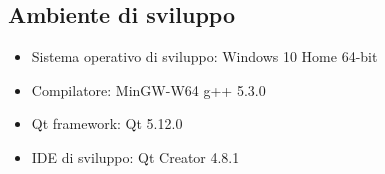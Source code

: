\subsection{Ambiente di sviluppo} %
\label{sub:ambiente_di_sviluppo}
\begin{itemize}
	\item Sistema operativo di sviluppo: Windows 10 Home 64-bit
	\item Compilatore: MinGW-W64 g++ 5.3.0
	\item Qt framework: Qt 5.12.0
	\item IDE di sviluppo: Qt Creator 4.8.1
\end{itemize}
